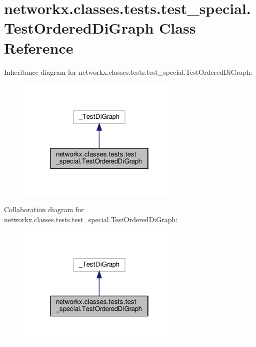 \hypertarget{classnetworkx_1_1classes_1_1tests_1_1test__special_1_1TestOrderedDiGraph}{}\section{networkx.\+classes.\+tests.\+test\+\_\+special.\+Test\+Ordered\+Di\+Graph Class Reference}
\label{classnetworkx_1_1classes_1_1tests_1_1test__special_1_1TestOrderedDiGraph}


Inheritance diagram for networkx.\+classes.\+tests.\+test\+\_\+special.\+Test\+Ordered\+Di\+Graph\+:
\nopagebreak
\begin{figure}[H]
\begin{center}
\leavevmode
\includegraphics[width=226pt]{classnetworkx_1_1classes_1_1tests_1_1test__special_1_1TestOrderedDiGraph__inherit__graph}
\end{center}
\end{figure}


Collaboration diagram for networkx.\+classes.\+tests.\+test\+\_\+special.\+Test\+Ordered\+Di\+Graph\+:
\nopagebreak
\begin{figure}[H]
\begin{center}
\leavevmode
\includegraphics[width=226pt]{classnetworkx_1_1classes_1_1tests_1_1test__special_1_1TestOrderedDiGraph__coll__graph}
\end{center}
\end{figure}
